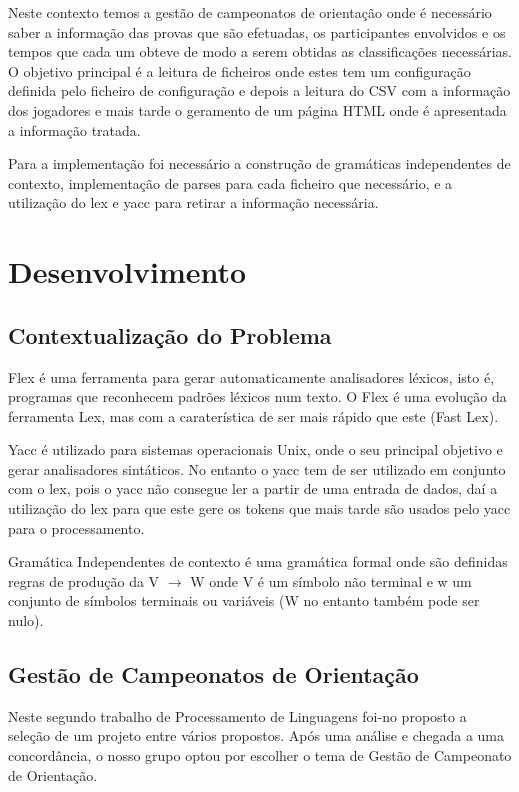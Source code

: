 \documentclass[11pt, a4paper, oneside]{article}
\begin{document}
Neste contexto temos a gestão de campeonatos de orientação onde é necessário saber a informação das provas que são efetuadas, os participantes envolvidos e os tempos que cada um obteve de modo a serem obtidas as classificações necessárias.
O objetivo principal é a leitura de ficheiros onde estes tem um configuração definida pelo ficheiro de configuração e depois a leitura do CSV com a informação dos jogadores e mais tarde o geramento de um página HTML onde é apresentada a informação tratada.

Para a implementação foi necessário a construção de gramáticas independentes de contexto, implementação de parses para cada ficheiro que necessário, e a utilização do lex e yacc para retirar a informação necessária.


\newpage
\section{Desenvolvimento}

\subsection{Contextualização do Problema}

Flex é uma ferramenta para gerar automaticamente analisadores léxicos, isto é, programas que reconhecem padrões léxicos num texto. O Flex é uma evolução da ferramenta Lex, mas com a caraterística de ser mais rápido que este (Fast Lex).

Yacc é utilizado para sistemas operacionais Unix, onde o seu principal objetivo e gerar analisadores sintáticos. No entanto o yacc tem de ser utilizado em conjunto com o lex, pois o yacc não consegue ler a partir de uma entrada de dados, daí a utilização  do lex para que este gere os tokens que mais tarde são usados pelo yacc para o processamento.

Gramática Independentes de contexto é uma gramática formal onde são definidas regras de produção da 
 V $\rightarrow$ W onde V é um símbolo não terminal e w um conjunto de símbolos terminais ou variáveis (W no entanto também pode ser nulo).

\subsection{Gestão de Campeonatos de Orientação }

Neste segundo trabalho de Processamento de Linguagens foi-no proposto a seleção de um projeto entre vários propostos. Após uma análise e chegada a uma concordância, o nosso grupo optou por escolher o tema de Gestão de Campeonato de Orientação.
\end{document}
